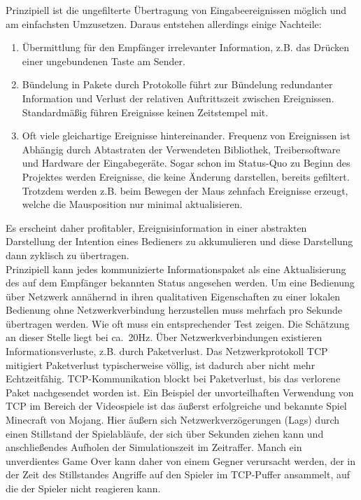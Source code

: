 Prinzipiell ist die ungefilterte Übertragung von Eingabeereignissen möglich und am einfachsten Umzusetzen. Daraus entstehen allerdings einige Nachteile:
\begin{enumerate}
\item Übermittlung für den Empfänger irrelevanter Information, z.B. das Drücken einer ungebundenen Taste am Sender.
\item Bündelung in Pakete durch Protokolle führt zur Bündelung redundanter Information und Verlust der relativen Auftrittszeit zwischen Ereignissen. Standardmäßig führen Ereignisse keinen Zeitstempel mit.
\item Oft viele gleichartige Ereignisse hintereinander. Frequenz von Ereignissen ist Abhängig durch Abtastraten der Verwendeten Bibliothek, Treibersoftware und Hardware der Eingabegeräte. Sogar schon im Status-Quo zu Beginn des Projektes werden Ereignisse, die keine Änderung darstellen, bereits gefiltert. Trotzdem werden z.B. beim Bewegen der Maus zehnfach Ereignisse erzeugt, welche die Mausposition nur minimal aktualisieren.
\end{enumerate}
Es erscheint daher profitabler, Ereignisinformation in einer abstrakten Darstellung der Intention eines Bedieners zu akkumulieren und diese Darstellung dann zyklisch zu übertragen.\\
Prinzipiell kann jedes kommunizierte Informationspaket als eine Aktualisierung des auf dem Empfänger bekannten Status angesehen werden.
Um eine Bedienung über Netzwerk annähernd in ihren qualitativen Eigenschaften zu einer lokalen Bedienung ohne Netzwerkverbindung herzustellen muss mehrfach pro Sekunde übertragen werden. Wie oft muss ein entsprechender Test zeigen. Die Schätzung an dieser Stelle liegt bei ca.~20Hz.
Über Netzwerkverbindungen existieren Informationsverluste, z.B. durch Paketverlust. Das Netzwerkprotokoll TCP mitigiert Paketverlust typischerweise völlig, ist dadurch aber nicht mehr Echtzeitfähig. TCP-Kommunikation blockt bei Paketverlust, bis das verlorene Paket nachgesendet worden ist. 
Ein Beispiel der unvorteilhaften Verwendung von TCP im Bereich der Videospiele ist das äußerst erfolgreiche und bekannte Spiel Minecraft von Mojang. Hier äußern sich Netzwerkverzögerungen (Lags) durch einen Stillstand der Spielabläufe, der sich über Sekunden ziehen kann und anschließendes Aufholen der Simulationszeit im Zeitraffer. Manch ein unverdientes Game Over kann daher von einem Gegner verursacht werden, der in der Zeit des Stillstandes Angriffe auf den Spieler im TCP-Puffer ansammelt, auf die der Spieler nicht reagieren kann.\\

